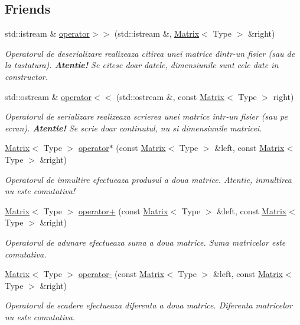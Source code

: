 \subsection*{Friends}
\begin{DoxyCompactItemize}
\item 
std::istream \& \hyperlink{classMatrix_a7e819908cb4e8e09980fd9381634d48f}{operator$>$$>$} (std::istream \&, \hyperlink{classMatrix}{Matrix}$<$ Type $>$ \&right)
\begin{DoxyCompactList}\small\item\em Operatorul de deserializare realizeaza citirea unei matrice dintr-\/un fisier (sau de la tastatura). {\bfseries  Atentie!} Se citesc doar datele, dimensiunile sunt cele date in constructor. \end{DoxyCompactList}\item 
std::ostream \& \hyperlink{classMatrix_a8f189cca48033f65cb272270343c2552}{operator$<$$<$} (std::ostream \&, const \hyperlink{classMatrix}{Matrix}$<$ Type $>$ right)
\begin{DoxyCompactList}\small\item\em Operatorul de serializare realizeaza scrierea unei matrice intr-\/un fisier (sau pe ecran). {\bfseries  Atentie!} Se scrie doar continutul, nu si dimensiunile matricei. \end{DoxyCompactList}\item 
\hyperlink{classMatrix}{Matrix}$<$ Type $>$ \hyperlink{classMatrix_a2010b1cbd96555d2031fe00cc3686c40}{operator$\ast$} (const \hyperlink{classMatrix}{Matrix}$<$ Type $>$ \&left, const \hyperlink{classMatrix}{Matrix}$<$ Type $>$ \&right)
\begin{DoxyCompactList}\small\item\em Operatorul de inmultire efectueaza produsul a doua matrice. Atentie, inmultirea nu este comutativa! \end{DoxyCompactList}\item 
\hyperlink{classMatrix}{Matrix}$<$ Type $>$ \hyperlink{classMatrix_a94ca96fc24df6e145ed15ee99447c188}{operator+} (const \hyperlink{classMatrix}{Matrix}$<$ Type $>$ \&left, const \hyperlink{classMatrix}{Matrix}$<$ Type $>$ \&right)
\begin{DoxyCompactList}\small\item\em Operatorul de adunare efectueaza suma a doua matrice. Suma matricelor este comutativa. \end{DoxyCompactList}\item 
\hyperlink{classMatrix}{Matrix}$<$ Type $>$ \hyperlink{classMatrix_ac80472ae19b5bc1f5390b34229c9efef}{operator-\/} (const \hyperlink{classMatrix}{Matrix}$<$ Type $>$ \&left, const \hyperlink{classMatrix}{Matrix}$<$ Type $>$ \&right)
\begin{DoxyCompactList}\small\item\em Operatorul de scadere efectueaza diferenta a doua matrice. Diferenta matricelor nu este comutativa. \end{DoxyCompactList}\end{DoxyCompactItemize}

